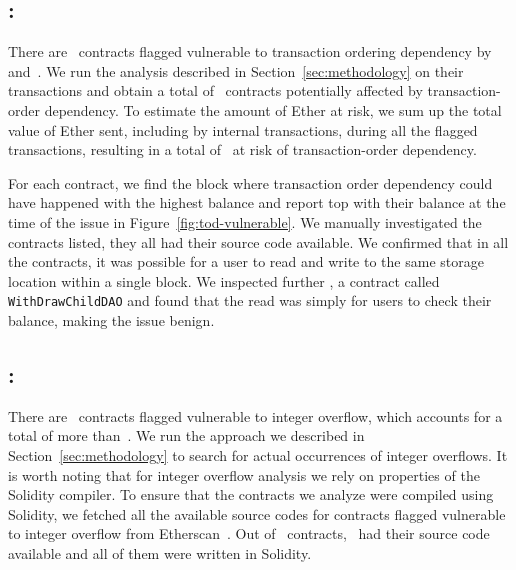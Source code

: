 



\subsection{\vto: \transactionorder}
There are~ contracts flagged vulnerable to transaction ordering dependency by~\cite{Luu2016a} and~\cite{DBLP:conf/ndss/KalraGDS18}. We run the analysis described in Section~\ref{sec:methodology} on their  transactions and obtain a total of~ contracts potentially affected by transaction-order dependency. To estimate the amount of Ether at risk, we sum up the total value of Ether sent, including by internal transactions, during all the flagged transactions, resulting in a total of~ at risk of transaction-order dependency.

For each contract, we find the block where transaction order dependency could have happened with the highest balance and report top with their balance at the time of the issue in Figure~\ref{fig:tod-vulnerable}. We manually investigated the contracts listed, they all had their source code available. We confirmed that in all the contracts, it was possible for a user to read and write to the same storage location within a single block. We inspected further , a contract called \lstinline{WithDrawChildDAO} and found that the read was simply for users to check their balance, making the issue benign.

% 



\subsection{\vio: \integeroverflow}
\label{ssec:analysis-io}
There are~ contracts flagged vulnerable to integer overflow, which accounts for a total of more than~. We run the approach we described in Section~\ref{sec:methodology} to search for actual occurrences of integer overflows.
It is worth noting that for integer overflow analysis we rely on properties of the Solidity compiler. To ensure that the contracts we analyze were compiled using Solidity, we fetched all the available source codes for contracts flagged vulnerable to integer overflow from Etherscan~\cite{etherscan}. Out of~ contracts,~ had their source code available and all of them were written in Solidity.

